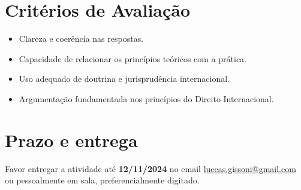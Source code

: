 \documentclass{article}
\begin{document}
\section{Critérios de Avaliação}

\begin{itemize}
    \item Clareza e coerência nas respostas.
    \item Capacidade de relacionar os princípios teóricos com a prática.
    \item Uso adequado de doutrina e jurisprudência internacional.
    \item Argumentação fundamentada nos princípios do Direito Internacional.
\end{itemize}

\section{Prazo e entrega}

Favor entregar a atividade até \textbf{12/11/2024} no email \href{mailto:luccas.gissoni@gmail.com}{luccas.gissoni@gmail.com} ou pessoalmente em sala, preferencialmente digitado.
\end{document}
